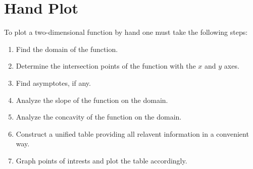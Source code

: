 \section{Hand Plot}

To plot a two-dimensional function by hand one must take the following steps:
\begin{enumerate}
    \item Find the domain of the function.
    \item Determine the intersection points of the function with the $x$
          and $y$ axes.
    \item Find asymptotes, if any.
    \item Analyze the slope of the function on the domain.
    \item Analyze the concavity of the function on the domain.
    \item Construct a unified table providing all relavent information in a
          convenient way.
    \item Graph points of intrests and plot the table accordingly.
\end{enumerate}













